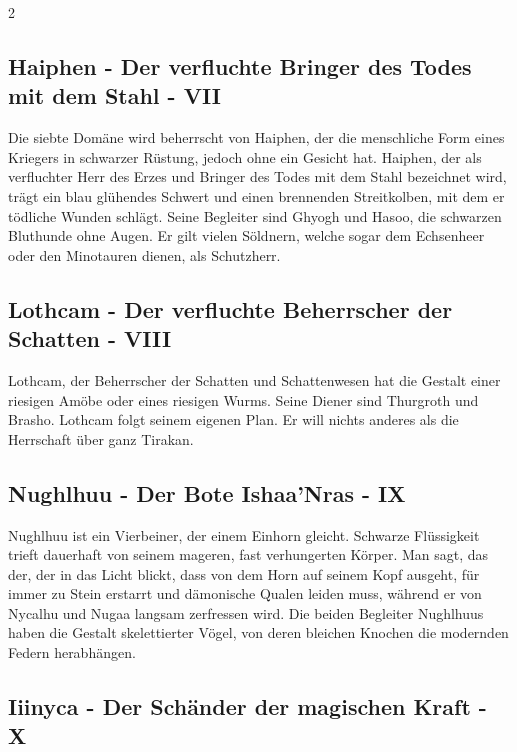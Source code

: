 \begin{multicols}{2}
{\subsection{Haiphen - Der verfluchte Bringer des Todes mit dem Stahl - VII}\label{subsec:haiphen-der-verfluchte-bringer-des-todes-mit-dem-stahl}

Die siebte Domäne wird beherrscht von Haiphen, der die menschliche Form eines Kriegers in schwarzer Rüstung, jedoch ohne ein Gesicht hat.
Haiphen, der als verfluchter Herr des Erzes und Bringer des Todes mit dem Stahl bezeichnet wird, trägt ein blau glühendes Schwert und einen brennenden Streitkolben, mit dem er tödliche Wunden schlägt.
Seine Begleiter sind Ghyogh und Hasoo, die schwarzen Bluthunde ohne Augen.
Er gilt vielen Söldnern, welche sogar dem Echsenheer oder den Minotauren dienen, als Schutzherr.

\subsection{Lothcam - Der verfluchte Beherrscher der Schatten - VIII}\label{subsec:lothcam-der-verfluchte-beherrscher-der-schatten}

Lothcam, der Beherrscher der Schatten und Schattenwesen hat die Gestalt einer riesigen Amöbe oder eines riesigen Wurms.
Seine Diener sind Thurgroth und Brasho.
Lothcam folgt seinem eigenen Plan.
Er will nichts anderes als die Herrschaft über ganz Tirakan.

\subsection{Nughlhuu - Der Bote Ishaa'Nras - IX}\label{subsec:nughlhuu-der-bote-ishaa'nras}

Nughlhuu ist ein Vierbeiner, der einem Einhorn gleicht.
Schwarze Flüssigkeit trieft dauerhaft von seinem mageren, fast verhungerten Körper.
Man sagt, das der, der in das Licht blickt, dass von dem Horn auf seinem Kopf ausgeht, für immer zu Stein erstarrt und dämonische Qualen leiden muss, während er von Nycalhu und Nugaa langsam zerfressen wird.
Die beiden Begleiter Nughlhuus haben die Gestalt skelettierter Vögel, von deren bleichen Knochen die modernden Federn herabhängen.

\subsection{Iiinyca - Der Schänder der magischen Kraft - X}\label{subsec:iiinyca-der-schander-der-magischen-kraft}

}
\end{multicols}
